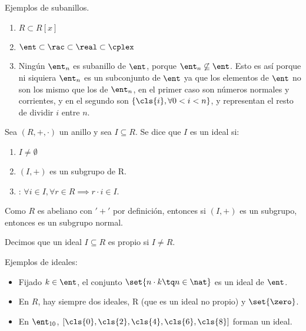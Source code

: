 \begin{example} Ejemplos de subanillos.
	\begin{enumerate}
		\item $R \subset R[x]$
		\item $\ent \subset \rac \subset \real \subset \cplex$
		\item Ningún $\ent_n$ es subanillo de $\ent$, porque $\ent_n \not \subseteq \ent$. Esto es así porque ni siquiera $\ent_n$ es un subconjunto de $\ent$ ya que los elementos de $\ent$ no son los mismo que los de $\ent_n$, en el primer caso son números normales y corrientes, y en el segundo son $\{\cls{i},  \forall 0<i<n\}$, y representan el resto de dividir $i$ entre $n$.
	\end{enumerate}
\end{example}


\begin{defn}[Ideal] %
Sea $(R,+,\cdot)$ un anillo y sea $I \subseteq R$. Se dice que $I$ es un ideal si:

	\begin{enumerate}
		\item $I \neq \emptyset$
		\item $(I, +)$ es un subgrupo de R.
		\item {}: $\forall i \in I, \forall r \in R \implies r\cdot i \in I$.
	\end{enumerate}
\end{defn}

\obs Como $R$ es abeliano con  $'+'$ por definición, entonces si $(I,+)$ es un subgrupo, entonces es un subgrupo normal.

\begin{defn}
	Decimos que un ideal $I \subseteq R$ es propio si $I \neq R$.
\end{defn}

\begin{example} Ejemplos de ideales:
	\begin{itemize}
		\item Fijado $k \in \ent$, el conjunto $\set{n\cdot k \tq n \in \nat }$ es un ideal de $\ent$.
		\item En $R$, hay siempre dos ideales, R (que es un ideal no propio) y $\set{\zero}$.
		\item En $\ent_{10}$, $[\cls{0},\cls{2},\cls{4},\cls{6},\cls{8} ]$ forman un ideal.
	\end{itemize}
\end{example}


